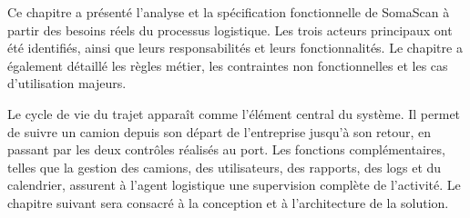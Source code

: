 Ce chapitre a présenté l'analyse et la spécification fonctionnelle de SomaScan à partir des besoins réels du processus logistique. Les trois acteurs principaux ont été identifiés, ainsi que leurs responsabilités et leurs fonctionnalités. Le chapitre a également détaillé les règles métier, les contraintes non fonctionnelles et les cas d'utilisation majeurs.

Le cycle de vie du trajet apparaît comme l'élément central du système. Il permet de suivre un camion depuis son départ de l'entreprise jusqu'à son retour, en passant par les deux contrôles réalisés au port. Les fonctions complémentaires, telles que la gestion des camions, des utilisateurs, des rapports, des logs et du calendrier, assurent à l'agent logistique une supervision complète de l'activité. Le chapitre suivant sera consacré à la conception et à l'architecture de la solution.
